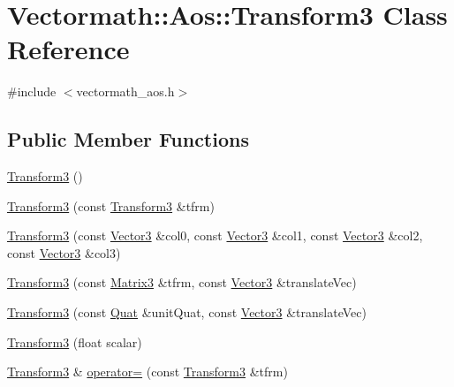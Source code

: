 \hypertarget{classVectormath_1_1Aos_1_1Transform3}{\section{Vectormath\-:\-:Aos\-:\-:Transform3 Class Reference}
\label{classVectormath_1_1Aos_1_1Transform3}
}


{\ttfamily \#include $<$vectormath\-\_\-aos.\-h$>$}

\subsection*{Public Member Functions}
\begin{DoxyCompactItemize}
\item 
\hyperlink{classVectormath_1_1Aos_1_1Transform3_a4c361ee4538c41a3d4dacc50b428b2ba}{Transform3} ()
\item 
\hyperlink{classVectormath_1_1Aos_1_1Transform3_a77ffda55c385ce413eb6f393485cc168}{Transform3} (const \hyperlink{classVectormath_1_1Aos_1_1Transform3}{Transform3} \&tfrm)
\item 
\hyperlink{classVectormath_1_1Aos_1_1Transform3_a43872d7a822d5384e3ee631d035d91be}{Transform3} (const \hyperlink{classVectormath_1_1Aos_1_1Vector3}{Vector3} \&col0, const \hyperlink{classVectormath_1_1Aos_1_1Vector3}{Vector3} \&col1, const \hyperlink{classVectormath_1_1Aos_1_1Vector3}{Vector3} \&col2, const \hyperlink{classVectormath_1_1Aos_1_1Vector3}{Vector3} \&col3)
\item 
\hyperlink{classVectormath_1_1Aos_1_1Transform3_a2c98e657db82e24e18c96a8a08f7cf74}{Transform3} (const \hyperlink{classVectormath_1_1Aos_1_1Matrix3}{Matrix3} \&tfrm, const \hyperlink{classVectormath_1_1Aos_1_1Vector3}{Vector3} \&translate\-Vec)
\item 
\hyperlink{classVectormath_1_1Aos_1_1Transform3_a5a2129a250b2482d68f5c366d9d67b59}{Transform3} (const \hyperlink{classVectormath_1_1Aos_1_1Quat}{Quat} \&unit\-Quat, const \hyperlink{classVectormath_1_1Aos_1_1Vector3}{Vector3} \&translate\-Vec)
\item 
\hyperlink{classVectormath_1_1Aos_1_1Transform3_afa3e8f627015d6c105f49b9cc993d980}{Transform3} (float scalar)
\item 
\hyperlink{classVectormath_1_1Aos_1_1Transform3}{Transform3} \& \hyperlink{classVectormath_1_1Aos_1_1Transform3_ad25d63812cd76766720009970c8c80bc}{operator=} (const \hyperlink{classVectormath_1_1Aos_1_1Transform3}{Transform3} \&tfrm)

\end{DoxyCompactItemize}
